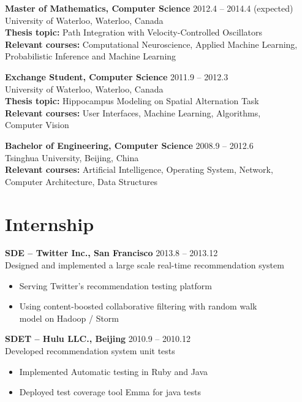 \documentclass[margin]{res}
\begin{document}
\begin{resume}
 {\bf Master of Mathematics, Computer Science} \hfill 2012.4 -- 2014.4 (expected)\\
 University of Waterloo, Waterloo, Canada\\
 {\bf Thesis topic:} Path Integration with Velocity-Controlled Oscillators\\
 {\bf Relevant courses:} Computational Neuroscience,  Applied Machine Learning,\\
 Probabilistic Inference and Machine Learning
 
 {\bf Exchange Student, Computer Science} \hfill 2011.9 -- 2012.3\\
 University of Waterloo, Waterloo, Canada\\
 {\bf Thesis topic:} Hippocampus Modeling on Spatial Alternation Task\\
 {\bf Relevant courses:} User Interfaces, Machine Learning, Algorithms, \\
 Computer Vision
 
 {\bf Bachelor of Engineering, Computer Science} \hfill 2008.9 -- 2012.6\\
 Tsinghua University, Beijing, China\\
 {\bf Relevant courses:} Artificial Intelligence, Operating System, Network, \\
 Computer Architecture, Data Structures

 
 
 \section{Internship}

 {\bf SDE -- Twitter Inc., San Francisco} \hfill 2013.8 -- 2013.12\\
 Designed and implemented a large scale real-time recommendation system
  \begin{itemize} \itemsep -2pt
  \item Serving Twitter's recommendation testing platform
  \item Using content-boosted collaborative filtering with random walk\\ model on Hadoop / Storm
  \end{itemize}

 {\bf SDET -- Hulu LLC., Beijing} \hfill 2010.9 -- 2010.12\\
 Developed recommendation system unit tests
  \begin{itemize} \itemsep -2pt
  \item Implemented Automatic testing in Ruby and Java
  \item Deployed test coverage tool Emma for java tests
  \end{itemize} 




\end{resume}
\end{document}
